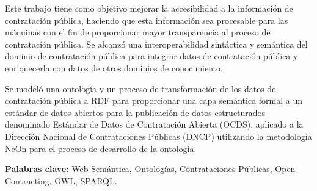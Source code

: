 \begin{resumen}

Este trabajo tiene como objetivo mejorar la accesibilidad a la información de contratación pública, haciendo que esta información sea procesable para las máquinas con el fin de proporcionar mayor transparencia al proceso de contratación pública. Se alcanzó una interoperabilidad sintáctica y semántica del dominio de contratación pública para integrar datos de contratación pública y enriquecerla con datos de otros dominios de conocimiento.

Se modeló una ontología y un proceso de transformación de los datos de contratación pública a RDF para proporcionar una capa semántica formal a un estándar de datos abiertos para la publicación de datos estructurados denominado Estándar de Datos de Contratación Abierta (OCDS), aplicado a la Dirección Nacional de Contrataciones Públicas (DNCP) utilizando la metodología NeOn para el proceso de desarrollo de la ontología.
    
\textbf{Palabras clave:} Web Semántica,  Ontologías, Contrataciones Públicas, Open Contracting, OWL, SPARQL.
\end{resumen}



